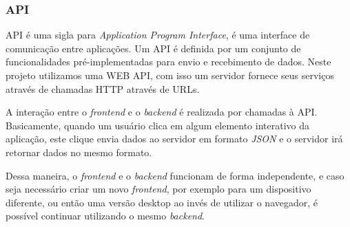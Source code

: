 		\subsubsection{API}

			API é uma sigla para \textit{Application Program Interface}, é uma interface de comunicação entre aplicações. Um API é definida por um conjunto de funcionalidades pré-implementadas para envio e recebimento de dados. Neste projeto utilizamos uma WEB API, com isso um servidor fornece seus serviços através de chamadas HTTP através de URLs.

			A interação entre o \textit{frontend} e o \textit{backend} é realizada por chamadas à API. Basicamente, quando um usuário clica em algum elemento interativo da aplicação, este clique envia dados ao servidor em formato \textit{JSON} e o servidor irá retornar dados no mesmo formato.

			Dessa maneira, o \textit{frontend} e o \textit{backend} funcionam de forma independente, e caso seja necessário criar um novo \textit{frontend}, por exemplo para um dispositivo diferente, ou então uma versão desktop ao invés de utilizar o navegador, é possível continuar utilizando o mesmo \textit{backend}.

